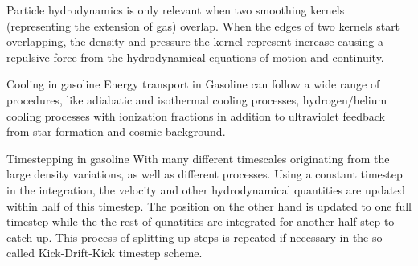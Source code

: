 Particle hydrodynamics is only relevant when two smoothing kernels (representing the extension of gas) overlap. When the edges of two kernels start overlapping, the density and pressure the kernel represent increase causing a repulsive force from the hydrodynamical equations of motion and continuity.

Cooling in gasoline
Energy transport in Gasoline can follow a wide range of procedures, like adiabatic and isothermal cooling processes, hydrogen/helium cooling processes with ionization fractions in addition to ultraviolet feedback from star formation and cosmic background.

Timestepping in gasoline
With many different timescales originating from the large density variations, as well as different processes.
Using a constant timestep in the integration, the velocity and other hydrodynamical quantities are updated within half of this timestep.
The position on the other hand is updated to one full timestep while the the rest of qunatities are integrated for another half-step to catch up. This process of splitting up steps is repeated if necessary in the so-called Kick-Drift-Kick timestep scheme.

\fi
